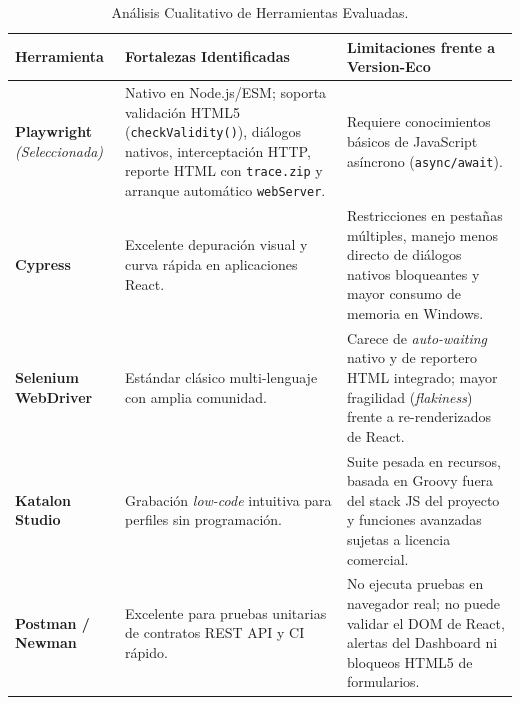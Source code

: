 \documentclass[11pt,a4paper]{article}
\begin{document}
\begin{table}[htbp]
\centering
\small
\begin{tabularx}{\textwidth}{p{2.6cm} X X}
\toprule
\textbf{Herramienta} & \textbf{Fortalezas Identificadas} & \textbf{Limitaciones frente a Version-Eco} \\
\midrule
\textbf{Playwright} \newline \textit{(Seleccionada)} & Nativo en Node.js/ESM; soporta validación HTML5 (\texttt{checkValidity()}), diálogos nativos, interceptación HTTP, reporte HTML con \texttt{trace.zip} y arranque automático \texttt{webServer}. & Requiere conocimientos básicos de JavaScript asíncrono (\texttt{async/await}). \\
\addlinespace
\textbf{Cypress} & Excelente depuración visual y curva rápida en aplicaciones React. & Restricciones en pestañas múltiples, manejo menos directo de diálogos nativos bloqueantes y mayor consumo de memoria en Windows. \\
\addlinespace
\textbf{Selenium WebDriver} & Estándar clásico multi-lenguaje con amplia comunidad. & Carece de \textit{auto-waiting} nativo y de reportero HTML integrado; mayor fragilidad (\textit{flakiness}) frente a re-renderizados de React. \\
\addlinespace
\textbf{Katalon Studio} & Grabación \textit{low-code} intuitiva para perfiles sin programación. & Suite pesada en recursos, basada en Groovy fuera del stack JS del proyecto y funciones avanzadas sujetas a licencia comercial. \\
\addlinespace
\textbf{Postman / Newman} & Excelente para pruebas unitarias de contratos REST API y CI rápido. & No ejecuta pruebas en navegador real; no puede validar el DOM de React, alertas del Dashboard ni bloqueos HTML5 de formularios. \\
\bottomrule
\end{tabularx}
\caption{Análisis Cualitativo de Herramientas Evaluadas.}\label{tab:cualitativo_herramientas}
\end{table}
\end{document}
